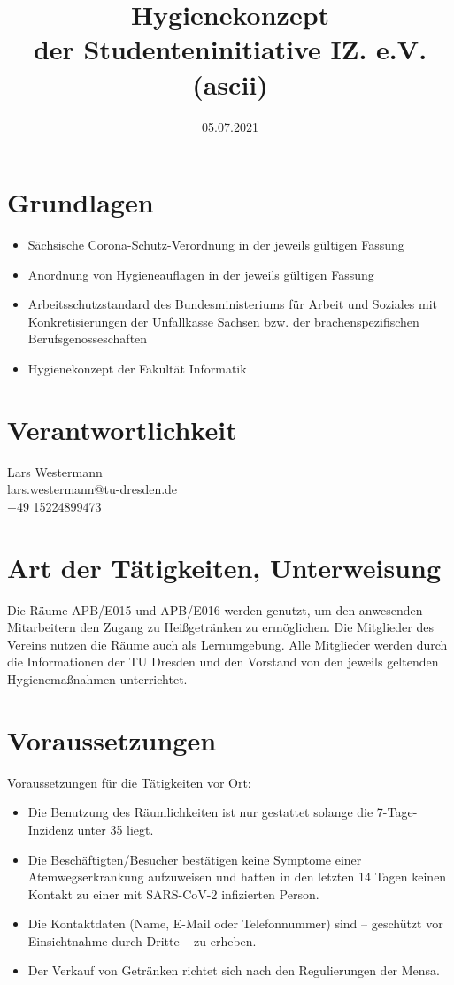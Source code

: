\documentclass[12pt]{article}
\title{Hygienekonzept\\der Studenteninitiative IZ. e.V. (ascii)}
\date{05.07.2021}
\author{}
\makeatletter
\newcommand*{\responsibleName}{Lars Westermann}
\newcommand*{\responsibleMail}{lars.westermann@tu-dresden.de}
\newcommand*{\responsiblePhone}{+49 15224899473}
\makeatother
\begin{document}
    \maketitle

    \section*{Grundlagen}

        \begin{itemize}
            \item Sächsische Corona-Schutz-Verordnung in der jeweils gültigen Fassung
            \item Anordnung von Hygieneauflagen in der jeweils gültigen Fassung
            \item Arbeitsschutzstandard des Bundesministeriums für Arbeit und Soziales mit Konkretisierungen der Unfallkasse Sachsen bzw. der brachenspezifischen Berufsgenosseschaften
            \item Hygienekonzept der Fakultät Informatik
        \end{itemize}

    \section*{Verantwortlichkeit}
        \responsibleName \\
        \responsibleMail \\
        \responsiblePhone

    \section{Art der Tätigkeiten, Unterweisung}
        Die Räume APB/E015 und APB/E016 werden genutzt, um den anwesenden Mitarbeitern den Zugang zu Heißgetränken zu ermöglichen.
        Die Mitglieder des Vereins nutzen die Räume auch als Lernumgebung.
        Alle Mitglieder werden durch die Informationen der TU Dresden und den Vorstand von den jeweils geltenden Hygienemaßnahmen unterrichtet.

    \section{Voraussetzungen}
        Voraussetzungen für die Tätigkeiten vor Ort:
        \begin{itemize}
            \item Die Benutzung des Räumlichkeiten ist nur gestattet solange die 7-Tage-Inzidenz unter 35 liegt.
            \item Die Beschäftigten/Besucher bestätigen keine Symptome einer Atem\-wegs\-erkrankung aufzuweisen und hatten in den letzten 14 Tagen keinen Kontakt zu einer mit SARS-CoV-2 infizierten Person.
            \item Die Kontaktdaten (Name, E-Mail oder Telefonnummer) sind – geschützt vor Einsichtnahme durch Dritte – zu erheben.
            \item Der Verkauf von Getränken richtet sich nach den Regulierungen der Mensa.
        \end{itemize}
\end{document}

